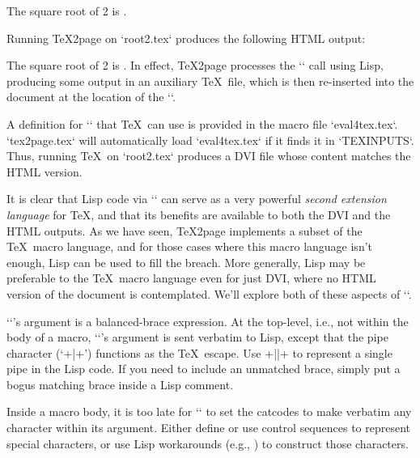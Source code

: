 \begintt


The square root of 2 is
.

\bye
\endtt
Running \TeX2page on `root2.tex` produces
the following HTML output:

\quote
The square root of 2 is
.
\endquote
In effect, \TeX2page processes the `\eval` call
using Lisp, producing some output in an auxiliary
\TeX\ file, which is then re-inserted into the document at the location of
the `\eval`.

A definition for `\eval` that \TeX\ can use
is provided in the macro file `eval4tex.tex`.
`tex2page.tex` will automatically load `eval4tex.tex` if it finds it in
`TEXINPUTS`.
Thus, running \TeX\ on
`root2.tex` produces a DVI file whose
content matches the HTML version.


It is clear that Lisp code via `\eval` can serve as
a very powerful {\em second extension language} for
\TeX, and that its benefits are available to both the
DVI and the HTML outputs.  As we have seen, \TeX2page
implements a subset of the \TeX\ macro language, and for
those cases where this macro language isn’t enough,
Lisp can be used to fill the breach.  More generally,
Lisp may be preferable to the \TeX\ macro language even
for just DVI, where no HTML version of the document is
contemplated.  We’ll explore both of these
aspects of `\eval`.

`\eval`’s argument is a balanced-brace
expression.  At the top-level, i.e., not within the body of a macro,
`\eval`’s argument is sent verbatim to Lisp, except that the pipe character
(‘\p+|+’) functions as the \TeX\ escape.  Use \p+||+ to represent a single
pipe in the Lisp code.  If you need to include an unmatched brace, simply
put a bogus matching brace inside a Lisp comment.

Inside a macro body, it is too late for `\eval` to set the catcodes
to make verbatim any character within its argument.  Either define or
use control sequences to represent special characters, or use
Lisp
workarounds (e.g., ) to construct those characters.

